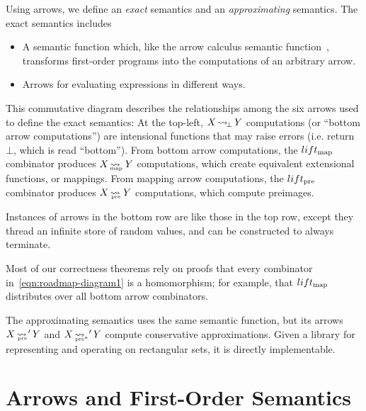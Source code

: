 Using arrows, we define an \emph{exact} semantics and an \emph{approximating} semantics.
The exact semantics includes
\begin{itemize}
	\item A semantic function which, like the arrow calculus semantic function~\cite{cit:lindley-2010jfp-arrow-calculus}, transforms first-order programs into the computations of an arbitrary arrow.
	\item Arrows for evaluating expressions in different ways.
\end{itemize}
This commutative diagram describes the relationships among the six arrows used to define the exact semantics:
At the top-left, $X \operatorname{\rightsquigarrow_{\mspace{-3mu}\bot}} Y$ computations (or ``bottom arrow computations'') are intensional functions that may raise errors (i.e. return $\bot$, which is read ``bottom'').
From bottom arrow computations, the $lift_\mathrm{map}$ combinator produces $X \operatorname{\rightsquigarrow_{\mspace{-23mu}_\mathrm{map}}} Y$ computations, which create equivalent extensional functions, or mappings.
From mapping arrow computations, the $lift_\mathrm{pre}$ combinator produces $X \operatorname{\rightsquigarrow_{\mspace{-20mu}_\mathrm{pre}}} Y$ computations, which compute preimages.

Instances of arrows in the bottom row are like those in the top row, except they thread an infinite store of random values, and can be constructed to always terminate.

Most of our correctness theorems rely on proofs that every combinator in~\eqref{eqn:roadmap-diagram1} is a homomorphism; for example, that $lift_\mathrm{map}$ distributes over all bottom arrow combinators.

The approximating semantics uses the same semantic function, but its arrows $X \operatorname{\rightsquigarrow_{\mspace{-20mu}_\mathrm{pre}}}' Y$ and $X \operatorname{\rightsquigarrow_{\mspace{-21mu}_{\mathrm{pre*}}}}' Y$ compute conservative approximations.
Given a library for representing and operating on rectangular sets, it is directly implementable.


\section{Arrows and First-Order Semantics}

